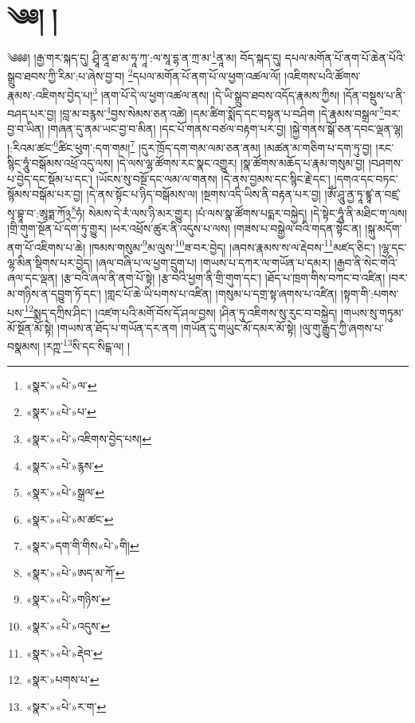 \chapter{༄༅། །}༄༅༅། །རྒྱ་གར་སྐད་དུ། ཤྲཱི་ནཱ་ཐ་མ་ཧཱ་ཀཱ་:ལ་སཱ་དྷ་ན་ཀྲ་མ་\footnote{«སྣར་»«པེ་»ལ་}ནཱ་མ། བོད་སྐད་དུ། དཔལ་མགོན་པོ་ནག་པོ་ཆེན་པོའི་སྒྲུབ་ཐབས་ཀྱི་རིམ་:པ་ཞེས་བྱ་བ། \footnote{«སྣར་»«པེ་»པ་}དཔལ་མགོན་པོ་ནག་པོ་ལ་ཕྱག་འཚལ་ལོ། །འཇིགས་པའི་ཚོགས་རྣམས་:འཇིགས་བྱེད་པ།\footnote{«སྣར་»«པེ་»འཇིགས་བྱེད་པས།} །ནག་པོ་དེ་ལ་ཕྱག་འཚལ་ནས། །དེ་ཡི་སྒྲུབ་ཐབས་འདོད་རྣམས་ཀྱིས། །དོན་བསྡུས་པ་ནི་བཤད་པར་བྱ། །བླ་མ་བརྙས་\footnote{«སྣར་»«པེ་»རྙས་}བྱས་སེམས་ཅན་འཚེ། །དམ་ཚིག་སྨོད་དང་བསྟན་པ་བཤིག །དེ་རྣམས་བསྒྲལ་\footnote{«སྣར་»«པེ་»སྒྲལ་}བར་བྱ་བ་ཡིན། །གཞན་དུ་ནམ་ཡང་བྱ་བ་མིན། །དང་པོ་གནས་བཙལ་བརྟག་པར་བྱ། །སྐྱེ་གནས་སྒོ་ཅན་དབང་ལྡན་ལྷ། །:རིའམ་ཚང་\footnote{«སྣར་»«པེ་»མ་ཚང་}ཚིང་ཕུག་:དག་གམ།\footnote{«སྣར་»དག་གི་གིས«པེ་»གི།} །དུར་ཁྲོད་དག་གམ་ལམ་ཅན་ནམ། །མཚན་མ་གཅིག་པ་དག་ཏུ་བྱ། །རང་སྙིང་ཧཱུཾ་བསྒོམས་འཕྲོ་འདུ་ལས། །དེ་ལས་ལྷ་ཚོགས་རང་སྣང་འགྱུར། །སྣ་ཚོགས་མཆོད་པ་རྣམ་གསུམ་བྱ། །བཤགས་པ་བྱེད་དང་སྡོམ་པ་དང་། །ཡོངས་སུ་བསྔོ་དང་ལམ་ལ་གནས། །དེ་ནས་བྱམས་དང་སྙིང་རྗེ་དང་། །དགའ་དང་བཏང་སྙོམས་བསྒོམ་པར་བྱ། །དེ་ནས་སྟོང་པ་ཉིད་བསྒོམས་ལ། །སྔགས་འདི་ཡིས་ནི་བརྟན་པར་བྱ། །ཨོཾ་ཤཱུ་ནྱ་ཏཱ་ཛྙཱ་ན་བཛྲ་སྭ་བྷཱ་བ་:ཨཱཏྨ་ཀོ྅\footnote{«སྣར་»«པེ་»ཨད་མ་ཀོ་}ཧཾ། སེམས་དེ་རཾ་ལས་ཉི་མར་གྱུར། །པཾ་ལས་སྣ་ཚོགས་པདྨར་བསྐྱེད། །དེ་སྟེང་ཧཱུཾ་ནི་མཐིང་ག་ལས། །གྲི་གུག་སྔོན་པོ་དག་ཏུ་གྱུར། །ཕར་འཕྲོས་ཚུར་ནི་འདུས་པ་ལས། །གཟས་པ་བསྒྱེལ་བའི་གདན་སྟེང་ན། །སྐུ་མདོག་ནག་པོ་འཇིགས་པ་ཆེ། །ཁམས་གསུམ་\footnote{«སྣར་»«པེ་»གཉིས་}མ་ལུས་\footnote{«སྣར་»«པེ་»འདུས་}ཟ་བར་བྱེད། །ཞབས་རྣམས་ས་ལ་རྡེབས་\footnote{«སྣར་»«པེ་»རྡེབ་}མཛད་ཅིང་། །ལྷ་དང་ལྷ་མིན་སྡིགས་པར་བྱེད། །ཞལ་བཞི་པ་ལ་ཕྱག་དྲུག་པ། །གཡས་པ་དཀར་ལ་གཡོན་པ་དམར། །རྒྱབ་ནི་སེང་གེའི་ཞལ་དང་ལྡན། །རྩ་བའི་ཞལ་ནི་ནག་པོ་སྟེ། །རྩ་བའི་ཕྱག་ནི་གྲི་གུག་དང་། །ཐོད་པ་ཁྲག་གིས་བཀང་བ་འཛིན། །བར་མ་གཉིས་ན་དབྱུག་ཏོ་དང་། །གླང་པོ་ཆེ་ཡི་པགས་པ་འཛིན། །གསུམ་པ་དགྲ་སྟ་ཞགས་པ་འཛིན། །སྟག་གི་:པགས་པས་\footnote{«སྣར་»པགས་པ་}སྨད་དཀྲིས་ཤིང་། །འཛག་པའི་མགོ་བོས་དོ་ཤལ་བྱས། །ཤིན་ཏུ་འཇིགས་སུ་རུང་བ་བསྐྱེད། །གཡས་སུ་གཏུམ་མོ་སྔོན་མོ་སྟེ། །གཡས་ན་ཐོད་པ་གཡོན་དར་ནག །གཡོན་དུ་གཡུང་མོ་དམར་མོ་སྟེ། །ལུ་གུ་རྒྱུད་ཀྱི་ཞགས་པ་བསྣམས། །རཀྵ་\footnote{«སྣར་»«པེ་»ར་ག་}སི་དང་སིངྒ་ལ། །
